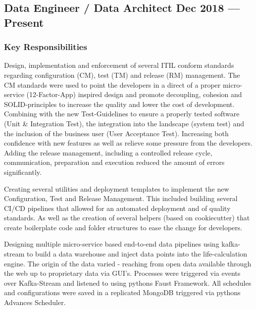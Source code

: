 \documentclass[letter,10pt]{article}
\begin{document}
\subsection{{Data Engineer / Data Architect \hfill Dec 2018 --- Present}}

\subsubsection*{{Key Responsibilities}}

\begin{zitemize}

	\item Design, implementation and enforcement of several ITIL conform standards regarding configuration (CM), test (TM) and release (RM) management. The CM standards were used to point the developers in a direct of a proper micro-service (12-Factor-App) inspired design and promote decoupling, cohesion and SOLID-principles to increase the quality and lower the cost of development. Combining with the new Test-Guidelines to ensure a properly tested software (Unit \& Integration Test), the integration into the landscape (system test) and the inclusion of the business user (User Acceptance Test). Increasing both confidence with new features as well as relieve some pressure from the developers. Adding the release management, including a controlled release cycle, communication, preparation and execution reduced the amount of errors  significantly. 

	\item Creating several utilities and deployment templates to implement the new Configuration, Test and Release Management. This included building several CI/CD pipelines that allowed for an automated deployment and  of quality standards. As well as the creation of several helpers (based on cookiecutter) that create boilerplate code and folder structures to ease the change for developers. 

	\item Designing multiple micro-service based end-to-end data pipelines using kafka-stream to build a data warehouse and inject data points into the life-calculation engine. The origin of the data varied - reaching from open data available through the web up to proprietary data via GUI's. Processes were triggered via events over Kafka-Stream and listened to using pythons Faust Framework. All schedules and configurations were saved in a replicated MongoDB triggered via pythons Advances Scheduler. 


\end{zitemize}
\end{document}
